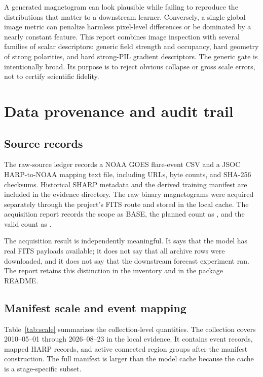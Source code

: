 \documentclass[11pt,oneside]{report}
\begin{document}
A generated magnetogram can look plausible while failing to reproduce the distributions that matter to a downstream learner. Conversely, a single global image metric can penalize harmless pixel-level differences or be dominated by a nearly constant feature. This report combines image inspection with several families of scalar descriptors: generic field strength and occupancy, hard geometry of strong polarities, and hard strong-PIL gradient descriptors. The generic gate is intentionally broad. Its purpose is to reject obvious collapse or gross scale errors, not to certify scientific fidelity.

\chapter{Data provenance and audit trail}

\section{Source records}

The raw-source ledger records a NOAA GOES flare-event CSV and a JSOC HARP-to-NOAA mapping text file, including URLs, byte counts, and SHA-256 checksums. Historical SHARP metadata and the derived training manifest are included in the evidence directory. The raw binary magnetograms were acquired separately through the project’s FITS route and stored in the local cache. The acquisition report records the scope as BASE, the planned count as \PlannedCount{}, and the valid count as \AcquiredCount{}.

The acquisition result is independently meaningful. It says that the model has real FITS payloads available; it does not say that all archive rows were downloaded, and it does not say that the downstream forecast experiment ran. The report retains this distinction in the inventory and in the package README.

\section{Manifest scale and event mapping}

Table~\ref{tab:scale} summarizes the collection-level quantities. The collection covers 2010--05--01 through 2026--08--23 in the local evidence. It contains \MOneEvents{} event records, \MappedHarps{} mapped HARP records, and \GroupCount{} active connected region groups after the manifest construction. The full manifest is larger than the model cache because the cache is a stage-specific subset.
\end{document}
